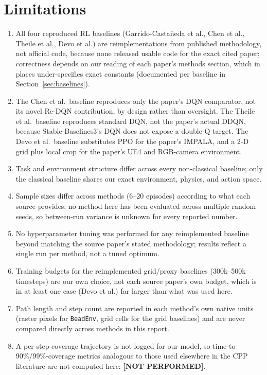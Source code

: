 \documentclass[conference]{IEEEtran}
\begin{document}
\section{Limitations}
\label{sec:limitations}

\begin{enumerate}
\item All four reproduced RL baselines (Garrido-Casta\~neda et al., Chen et al., Theile et al., Devo et al.) are reimplementations from published methodology, not official code, because none released usable code for the exact cited paper; correctness depends on our reading of each paper's methods section, which in places under-specifies exact constants (documented per baseline in Section~\ref{sec:baselines}).
\item The Chen et al.\ baseline reproduces only the paper's DQN comparator, not its novel Re-DQN contribution, by design rather than oversight. The Theile et al.\ baseline reproduces standard DQN, not the paper's actual DDQN, because Stable-Baselines3's DQN does not expose a double-Q target. The Devo et al.\ baseline substitutes PPO for the paper's IMPALA, and a 2-D grid plus local crop for the paper's UE4 and RGB-camera environment.
\item Task and environment structure differ across every non-classical baseline; only the classical baseline shares our exact environment, physics, and action space.
\item Sample sizes differ across methods (6--20 episodes) according to what each source provides; no method here has been evaluated across multiple random seeds, so between-run variance is unknown for every reported number.
\item No hyperparameter tuning was performed for any reimplemented baseline beyond matching the source paper's stated methodology; results reflect a single run per method, not a tuned optimum.
\item Training budgets for the reimplemented grid/proxy baselines (300k--500k timesteps) are our own choice, not each source paper's own budget, which is in at least one case (Devo et al.) far larger than what was used here.
\item Path length and step count are reported in each method's own native units (raster pixels for \texttt{BeadEnv}, grid cells for the grid baselines) and are never compared directly across methods in this report.
\item A per-step coverage trajectory is not logged for our model, so time-to-90\%/99\%-coverage metrics analogous to those used elsewhere in the CPP literature are not computed here: \textbf{[NOT PERFORMED]}.
\end{enumerate}
\end{document}
